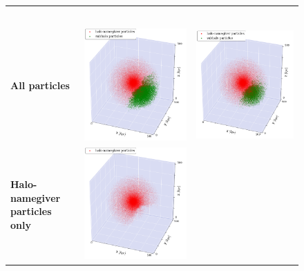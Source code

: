 \begin{subfigures}
	\begin{figure}[!htbp]
		{
		\renewcommand{\arraystretch}{0.1}		
		\centering	
		\begin{tabular}{|p{.5cm} c c|}
			\hline
			&&\\[1em]
			&	\phewon\ 	& \simple \\[1.5em]
			\begin{sideways}{\hspace{3cm} \textbf{All particles}}\end{sideways} \hspace*{-1em}	&		 
			{\includegraphics[width = .42\textwidth]{images/dice-two/dice-two-plot-halo1451-phew.png}} \hspace*{-1em} 	& 
			{\includegraphics[width = .42\textwidth]{images/dice-two/dice-two-plot-halo1451-nosaddle.png}} \hspace*{-1em}	\\
			\begin{sideways}{ \hspace{.5cm}\textbf{Halo-namegiver particles only} }\end{sideways}	 \hspace*{-1em}			 &			 
			{\includegraphics[width = .42\textwidth]{images/dice-two/dice-two-halo-only-phew.png}} \hspace*{-1em} 		&

\end{tabular}}
\end{figure}
\end{subfigures}
